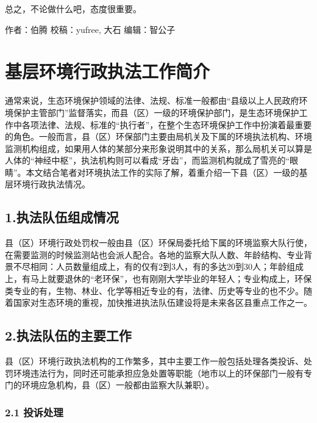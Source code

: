 \documentclass[]{book}
\begin{document}
总之，不论做什么吧，态度很重要。

作者：伯腾 校稿：yufree, 大石 编辑：智公子

\section{基层环境行政执法工作简介}

通常来说，生态环境保护领域的法律、法规、标准一般都由``县级以上人民政府环境保护主管部门''监督落实，而县（区）一级的环境保护部门，是生态环境保护工作中各项法律、法规、标准的``执行者''，在整个生态环境保护工作中扮演着最重要的角色。一般而言，县（区）环保部门主要由局机关及下属的环境执法机构、环境监测机构组成，如果用人体的某部分来形象说明其中的关系，那么局机关可以算是人体的``神经中枢''，执法机构则可以看成``牙齿''，而监测机构就成了雪亮的``眼睛''。本文结合笔者对环境执法工作的实际了解，着重介绍一下县（区）一级的基层环境行政执法情况。

\subsection{1.执法队伍组成情况}

县（区）环境行政处罚权一般由县（区）环保局委托给下属的环境监察大队行使，在需要监测的时候监测站也会派人配合。各地的监察大队人数、年龄结构、专业背景不尽相同：人员数量组成上，有的仅有2到3人，有的多达20到30人；年龄组成上，有马上就要退休的``老环保''，也有刚刚大学毕业的年轻人；专业构成上，环保类专业的有，生物、林业、化学等相近专业的有，法律、历史等专业的也不少。随着国家对生态环境的重视，加快推进执法队伍建设将是未来各区县重点工作之一。

\subsection{2.执法队伍的主要工作}

县（区）环境行政执法机构的工作繁多，其中主要工作一般包括处理各类投诉、处罚环境违法行为，同时还可能承担应急处置等职能（地市以上的环保部门一般有专门的环境应急机构，县（区）一般都由监察大队兼职）。

\subsubsection{2.1 投诉处理}
\end{document}
